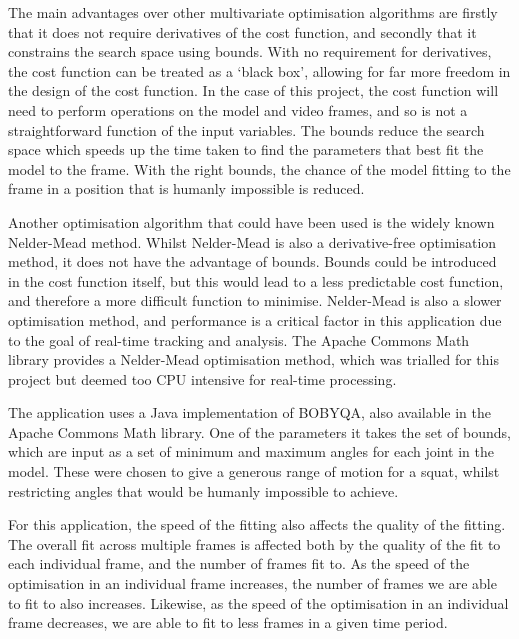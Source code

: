 The main advantages over other multivariate optimisation algorithms are firstly that it does not require derivatives of the cost function, and secondly that it constrains the search space using bounds. With no requirement for derivatives, the cost function can be treated as a `black box', allowing for far more freedom in the design of the cost function. In the case of this project, the cost function will need to perform operations on the model and video frames, and so is not a straightforward function of the input variables. The bounds reduce the search space which speeds up the time taken to find the parameters that best fit the model to the frame. With the right bounds, the chance of the model fitting to the frame in a position that is humanly impossible is reduced.

Another optimisation algorithm that could have been used is the widely known Nelder-Mead method\cite{neldermead}. Whilst Nelder-Mead is also a derivative-free optimisation method, it does not have the advantage of bounds. Bounds could be introduced in the cost function itself, but this would lead to a less predictable cost function, and therefore a more difficult function to minimise. Nelder-Mead is also a slower optimisation method, and performance is a critical factor in this application due to the goal of real-time tracking and analysis. The Apache Commons Math library\cite{apachemath} provides a Nelder-Mead optimisation method, which was trialled for this project but deemed too CPU intensive for real-time processing.

The application uses a Java implementation of BOBYQA, also available in the Apache Commons Math library\cite{apachemath}. One of the parameters it takes the set of bounds, which are input as a set of minimum and maximum angles for each joint in the model. These were chosen to give a generous range of motion for a squat, whilst restricting angles that would be humanly impossible to achieve.

For this application, the speed of the fitting also affects the quality of the fitting. The overall fit across multiple frames is affected both by the quality of the fit to each individual frame, and the number of frames fit to. As the speed of the optimisation in an individual frame increases, the number of frames we are able to fit to also increases. Likewise, as the speed of the optimisation in an individual frame decreases, we are able to fit to less frames in a given time period.

